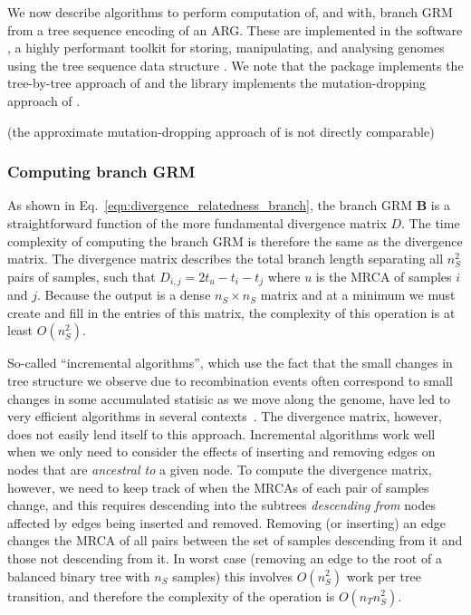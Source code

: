 We now describe algorithms to perform computation of, and with, branch GRM
from a tree sequence encoding of an ARG.
%
These are implemented in the \tskit{} software \citep{ralph2020efficiently, kelleher2024tskit},
a highly performant toolkit for storing, manipulating, and analysing genomes using the tree sequence data structure
\citep{kelleher2016efficient, kelleher2018efficient, wong2023general}.
%
We note that the \eGRM{} package implements the tree-by-tree approach of
\citet{fan2022genealogical} and the \ARGneedlelib{} library implements the
mutation-dropping approach of \citet{zhang2023biobank}.

(the approximate mutation-dropping approach of \citet{zhang2023biobank} is 
not directly comparable)

\subsubsection{Computing branch GRM}

As shown in Eq.~\eqref{eqn:divergence_relatedness_branch}, the branch GRM
$\mathbf{B}$ is a 
straightforward function of the more fundamental divergence matrix $D$.
The time complexity of computing the branch GRM is therefore the same as 
the divergence matrix.
The divergence matrix describes
the total branch length separating all $n_S^2$ pairs of samples, such 
that $D_{i,j} = 2t_u - t_i - t_j$ where $u$ is the MRCA of samples $i$ and $j$.
Because the output is a dense $n_S \times n_S$ matrix 
and at a minimum we must create and fill in the entries of this matrix,
the complexity of this operation is at least $O(n_S^2)$.

So-called ``incremental algorithms'', which use the fact that the 
small changes in tree structure we observe due to recombination events
often correspond to small changes in some accumulated statisic as 
we move along the genome,
have led to very efficient algorithms in several 
contexts~\citep{kelleher2016efficient,ralph2020efficiently,kelleher2020coalescent}. 
The divergence matrix, however, does not easily lend itself to this approach.
Incremental algorithms work well when we only need to consider the effects 
of inserting and removing edges on nodes that are \emph{ancestral to}
a given node. To compute the divergence matrix, however, we need to keep track
of when the MRCAs of each pair of samples change, and this requires 
descending into the subtrees \emph{descending from} nodes affected by 
edges being inserted and removed. Removing (or inserting) an edge changes the MRCA of 
all pairs between the set of samples descending from it 
and those not descending from it. In worst case (removing an edge to the 
root of a balanced binary tree with $n_S$ samples) this involves 
$O(n_S^2)$ work per tree transition, and therefore the complexity of the 
operation is $O(n_T n_S^2)$. 

